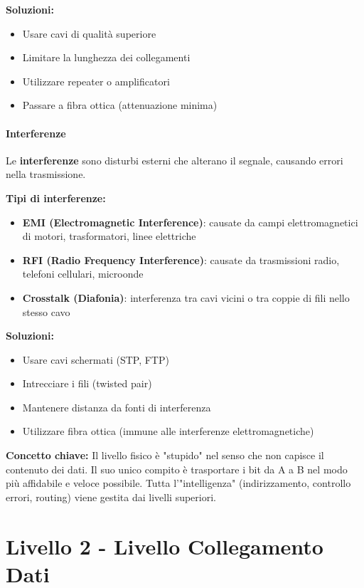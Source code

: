 \documentclass[12pt,a4paper]{article}
\begin{document}
\textbf{Soluzioni:}
\begin{itemize}
    \item Usare cavi di qualità superiore
    \item Limitare la lunghezza dei collegamenti
    \item Utilizzare repeater o amplificatori
    \item Passare a fibra ottica (attenuazione minima)
\end{itemize}

\paragraph{Interferenze}
Le \textbf{interferenze} sono disturbi esterni che alterano il segnale, causando errori nella trasmissione.

\textbf{Tipi di interferenze:}
\begin{itemize}
    \item \textbf{EMI (Electromagnetic Interference)}: causate da campi elettromagnetici di motori, trasformatori, linee elettriche
    \item \textbf{RFI (Radio Frequency Interference)}: causate da trasmissioni radio, telefoni cellulari, microonde
    \item \textbf{Crosstalk (Diafonia)}: interferenza tra cavi vicini o tra coppie di fili nello stesso cavo
\end{itemize}

\textbf{Soluzioni:}
\begin{itemize}
    \item Usare cavi schermati (STP, FTP)
    \item Intrecciare i fili (twisted pair)
    \item Mantenere distanza da fonti di interferenza
    \item Utilizzare fibra ottica (immune alle interferenze elettromagnetiche)
\end{itemize}

\vspace{0.5cm}
\noindent
\textbf{Concetto chiave:} Il livello fisico è "stupido" nel senso che non capisce il contenuto dei dati. Il suo unico compito è trasportare i bit da A a B nel modo più affidabile e veloce possibile. Tutta l'"intelligenza" (indirizzamento, controllo errori, routing) viene gestita dai livelli superiori.

\section{Livello 2 - Livello Collegamento Dati}
\end{document}
